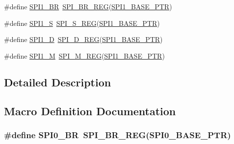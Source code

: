 \begin{DoxyCompactItemize}
\item 
\#define \hyperlink{group___s_p_i___register___accessor___macros_ga944c7904356c8eb8f0cde2ab94095ebe}{S\+P\+I1\+\_\+\+BR}~\hyperlink{group___s_p_i___register___accessor___macros_gac5dff3cf0898bfd7d2230d49cb3951a9}{S\+P\+I\+\_\+\+B\+R\+\_\+\+R\+EG}(\hyperlink{group___s_p_i___peripheral_gae28fd789e0602a32076c1c13ca39f5af}{S\+P\+I1\+\_\+\+B\+A\+S\+E\+\_\+\+P\+TR})
\item 
\#define \hyperlink{group___s_p_i___register___accessor___macros_ga5e490d3dc9f5812324f2ade33ae7d2e4}{S\+P\+I1\+\_\+S}~\hyperlink{group___s_p_i___register___accessor___macros_ga88ebe8b9c7afe3c8d2aa0d9de8d860e2}{S\+P\+I\+\_\+\+S\+\_\+\+R\+EG}(\hyperlink{group___s_p_i___peripheral_gae28fd789e0602a32076c1c13ca39f5af}{S\+P\+I1\+\_\+\+B\+A\+S\+E\+\_\+\+P\+TR})
\item 
\#define \hyperlink{group___s_p_i___register___accessor___macros_ga8760cd86fbace95539c11d135eb57011}{S\+P\+I1\+\_\+D}~\hyperlink{group___s_p_i___register___accessor___macros_ga44444744f147821a03664f89cdf93c0c}{S\+P\+I\+\_\+\+D\+\_\+\+R\+EG}(\hyperlink{group___s_p_i___peripheral_gae28fd789e0602a32076c1c13ca39f5af}{S\+P\+I1\+\_\+\+B\+A\+S\+E\+\_\+\+P\+TR})
\item 
\#define \hyperlink{group___s_p_i___register___accessor___macros_ga95f41b6dc0418cb02ecbe3143b66caa3}{S\+P\+I1\+\_\+M}~\hyperlink{group___s_p_i___register___accessor___macros_gaf2776d85ed3269dd24085747bb361d0a}{S\+P\+I\+\_\+\+M\+\_\+\+R\+EG}(\hyperlink{group___s_p_i___peripheral_gae28fd789e0602a32076c1c13ca39f5af}{S\+P\+I1\+\_\+\+B\+A\+S\+E\+\_\+\+P\+TR})
\end{DoxyCompactItemize}


\subsection{Detailed Description}


\subsection{Macro Definition Documentation}
\subsubsection[{\texorpdfstring{S\+P\+I0\+\_\+\+BR}{SPI0_BR}}]{\setlength{\rightskip}{0pt plus 5cm}\#define S\+P\+I0\+\_\+\+BR~{\bf S\+P\+I\+\_\+\+B\+R\+\_\+\+R\+EG}({\bf S\+P\+I0\+\_\+\+B\+A\+S\+E\+\_\+\+P\+TR})}\hypertarget{group___s_p_i___register___accessor___macros_ga93e98222b0b06341f341376cc7a4b39a}{}\label{group___s_p_i___register___accessor___macros_ga93e98222b0b06341f341376cc7a4b39a}


